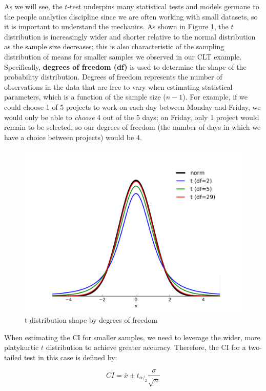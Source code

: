 \documentclass[
]{book}
\begin{document}
As we will see, the \(t\)-test underpins many statistical tests and models germane to the people analytics discipline since we are often working with small datasets, so it is important to understand the mechanics. As shown in Figure \ref{fig:t-distribution}, the \(t\) distribution is increasingly wider and shorter relative to the normal distribution as the sample size decreases; this is also characteristic of the sampling distribution of means for smaller samples we observed in our CLT example. Specifically, \textbf{degrees of freedom (df)} is used to determine the shape of the probability distribution. Degrees of freedom represents the number of observations in the data that are free to vary when estimating statistical parameters, which is a function of the sample size (\(n - 1\)). For example, if we could choose 1 of 5 projects to work on each day between Monday and Friday, we would only be able to \emph{choose} 4 out of the 5 days; on Friday, only 1 project would remain to be selected, so our degrees of freedom (the number of days in which we have a choice between projects) would be 4.

\begin{figure}

{\centering \includegraphics[width=0.75\linewidth]{graphics/t_distribution} 

}

\caption{t distribution shape by degrees of freedom}\label{fig:t-distribution}
\end{figure}

When estimating the CI for smaller samples, we need to leverage the wider, more platykurtic \(t\) distribution to achieve greater accuracy. Therefore, the CI for a two-tailed test in this case is defined by:

\[ CI = \bar{x} \pm t_{\alpha/_2} \frac{\sigma}{\sqrt{n}} \]
\end{document}
